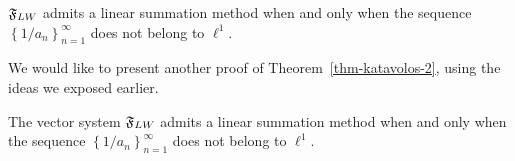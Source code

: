 \documentclass[12pt]{amsart}
\begin{document}
      \begin{theorem}
        \label{thm-katavolos-2}
          $\mathfrak{F}_{LW}$ admits a linear summation method when and only when
            the sequence $\left\{1/a_n\right\}_{n=1}^\infty$ does not belong to $\ell^1$.
      \end{theorem}
      We would like to present another proof of Theorem~\ref{thm-katavolos-2}, using the ideas we exposed earlier.
      \begin{prop}
        The vector system $\mathfrak{F}_{LW}$ admits a linear summation method when and only when
          the sequence $\left\{1/a_n\right\}_{n=1}^\infty$ does not belong to $\ell^1$.
      \end{prop}
\end{document}
